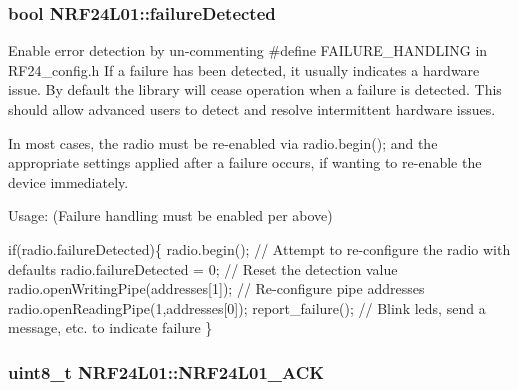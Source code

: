 \subsubsection[{\texorpdfstring{failure\+Detected}{failureDetected}}]{\setlength{\rightskip}{0pt plus 5cm}bool N\+R\+F24\+L01\+::failure\+Detected}\hypertarget{classNRF24L01_a749f38c45c00905b3d8e8c180626bff6}{}\label{classNRF24L01_a749f38c45c00905b3d8e8c180626bff6}
Enable error detection by un-\/commenting \#define F\+A\+I\+L\+U\+R\+E\+\_\+\+H\+A\+N\+D\+L\+I\+NG in R\+F24\+\_\+config.\+h If a failure has been detected, it usually indicates a hardware issue. By default the library will cease operation when a failure is detected. This should allow advanced users to detect and resolve intermittent hardware issues.

In most cases, the radio must be re-\/enabled via radio.\+begin(); and the appropriate settings applied after a failure occurs, if wanting to re-\/enable the device immediately.

Usage\+: (Failure handling must be enabled per above) 
\begin{DoxyCode}
\textcolor{keywordflow}{if}(radio.failureDetected)\{
  radio.begin();                       \textcolor{comment}{// Attempt to re-configure the radio with defaults}
  radio.failureDetected = 0;           \textcolor{comment}{// Reset the detection value}
 radio.openWritingPipe(addresses[1]); \textcolor{comment}{// Re-configure pipe addresses}
  radio.openReadingPipe(1,addresses[0]);
  report\_failure();                    \textcolor{comment}{// Blink leds, send a message, etc. to indicate failure}
\}
\end{DoxyCode}
\subsubsection[{\texorpdfstring{N\+R\+F24\+L01\+\_\+\+A\+CK}{NRF24L01_ACK}}]{\setlength{\rightskip}{0pt plus 5cm}uint8\+\_\+t N\+R\+F24\+L01\+::\+N\+R\+F24\+L01\+\_\+\+A\+CK\hspace{0.3cm}{\ttfamily [private]}}\hypertarget{classNRF24L01_af2e0a88f330c86d0cc6c43180f70ecbd}{}\label{classNRF24L01_af2e0a88f330c86d0cc6c43180f70ecbd}
